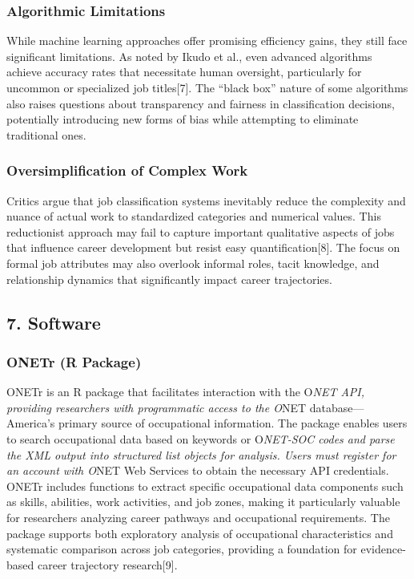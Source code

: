 \documentclass[
  letterpaper,
  DIV=11,
  numbers=noendperiod]{scrartcl}
\begin{document}
\subsubsection{Algorithmic Limitations}\label{algorithmic-limitations}

While machine learning approaches offer promising efficiency gains, they
still face significant limitations. As noted by Ikudo et al., even
advanced algorithms achieve accuracy rates that necessitate human
oversight, particularly for uncommon or specialized job titles{[}7{]}.
The ``black box'' nature of some algorithms also raises questions about
transparency and fairness in classification decisions, potentially
introducing new forms of bias while attempting to eliminate traditional
ones.

\subsubsection{Oversimplification of Complex
Work}\label{oversimplification-of-complex-work}

Critics argue that job classification systems inevitably reduce the
complexity and nuance of actual work to standardized categories and
numerical values. This reductionist approach may fail to capture
important qualitative aspects of jobs that influence career development
but resist easy quantification{[}8{]}. The focus on formal job
attributes may also overlook informal roles, tacit knowledge, and
relationship dynamics that significantly impact career trajectories.

\subsection{7. Software}\label{software}

\subsubsection{ONETr (R Package)}\label{onetr-r-package}

ONETr is an R package that facilitates interaction with the O\emph{NET
API, providing researchers with programmatic access to the O}NET
database---America's primary source of occupational information. The
package enables users to search occupational data based on keywords or
O\emph{NET-SOC codes and parse the XML output into structured list
objects for analysis. Users must register for an account with O}NET Web
Services to obtain the necessary API credentials. ONETr includes
functions to extract specific occupational data components such as
skills, abilities, work activities, and job zones, making it
particularly valuable for researchers analyzing career pathways and
occupational requirements. The package supports both exploratory
analysis of occupational characteristics and systematic comparison
across job categories, providing a foundation for evidence-based career
trajectory research{[}9{]}.
\end{document}
